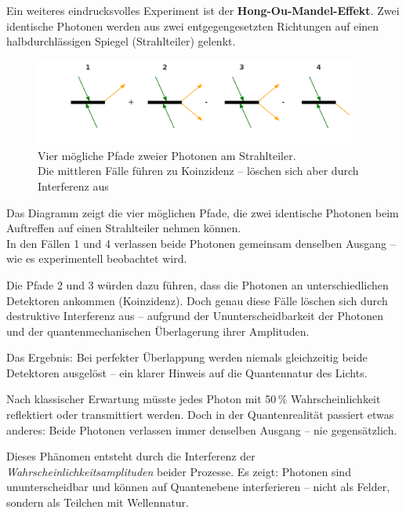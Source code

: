Ein weiteres eindrucksvolles Experiment ist der \textbf{Hong-Ou-Mandel-Effekt}. Zwei identische Photonen werden aus zwei entgegengesetzten Richtungen auf einen halbdurchlässigen Spiegel (Strahlteiler) gelenkt.
\begin{figure}[H]
	\begin{center}
		\includegraphics[width=0.95\textwidth]{bilder/hom_interferenzpfade_korrigiert.png}
		
	\end{center}
	\caption{Vier mögliche Pfade zweier Photonen am Strahlteiler.\\
		Die mittleren Fälle führen zu Koinzidenz – löschen sich aber durch Interferenz aus}
\end{figure}

\begin{tcolorbox}[hinweisbox, title=Was diese Darstellung zeigt]
	\label{box:was diese Darstellun}
	\small
	Das Diagramm zeigt die vier möglichen Pfade, die zwei identische Photonen beim Auftreffen auf einen Strahlteiler nehmen können.\\
	In den Fällen 1 und 4 verlassen beide Photonen gemeinsam denselben Ausgang – wie es experimentell beobachtet wird.
	
	Die Pfade 2 und 3 würden dazu führen, dass die Photonen an unterschiedlichen Detektoren ankommen (Koinzidenz). Doch genau diese Fälle löschen sich durch destruktive Interferenz aus – aufgrund der Ununterscheidbarkeit der Photonen und der quantenmechanischen Überlagerung ihrer Amplituden.
	
	Das Ergebnis: Bei perfekter Überlappung werden niemals gleichzeitig beide Detektoren ausgelöst – ein klarer Hinweis auf die Quantennatur des Lichts.
\end{tcolorbox}

Nach klassischer Erwartung müsste jedes Photon mit 50\,\% Wahrscheinlichkeit reflektiert oder transmittiert werden. Doch in der Quantenrealität passiert etwas anderes: Beide Photonen verlassen immer denselben Ausgang – nie gegensätzlich.

Dieses Phänomen entsteht durch die Interferenz der \emph{Wahrscheinlichkeitsamplituden} beider Prozesse. Es zeigt: Photonen sind ununterscheidbar und können auf Quantenebene interferieren – nicht als Felder, sondern als Teilchen mit Wellennatur.

